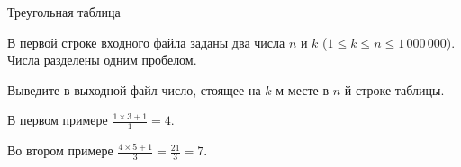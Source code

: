 \begin{problem}{Треугольная таблица}
\InputFile

В первой строке входного файла заданы два числа $n$ и $k$
($1 \le k \le n \le 1\,000\,000$).
Числа разделены одним пробелом.

\OutputFile

Выведите в выходной файл число, стоящее на $k$-м месте в $n$-й строке таблицы.

\Examples

\begin{example}%
%
%
\end{example}

\Explanations

В первом примере
$\frac{1 \times 3 + 1}{1} = 4$.

Во втором примере
$\frac{4 \times 5 + 1}{3} = \frac{21}{3} = 7$.

\end{problem}
